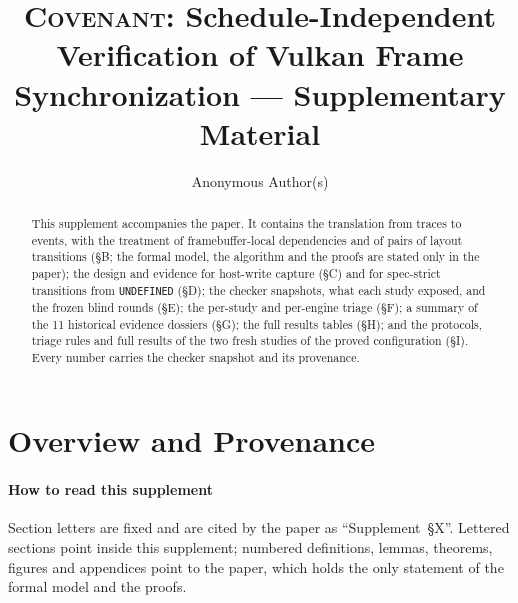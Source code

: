 \documentclass[acmtog,anonymous,review]{acmart}
\newcommand{\code}[1]{\texttt{#1}}
\begin{document}
\title{\textsc{Covenant}: Schedule-Independent Verification of Vulkan Frame Synchronization --- Supplementary Material}
\author{Anonymous Author(s)}

\begin{abstract}
This supplement accompanies the paper. It contains the translation from traces to events, with the treatment of
framebuffer-local dependencies and of pairs of layout transitions (\S B; the formal model, the algorithm and the
proofs are stated only in the paper); the design and evidence for host-write capture (\S C) and for spec-strict
transitions from \code{UNDEFINED} (\S D); the checker snapshots, what each study exposed, and the frozen blind rounds
(\S E); the per-study and per-engine triage (\S F); a summary of the 11 historical evidence dossiers (\S G); the full
results tables (\S H); and the protocols, triage rules and full results of the two fresh studies of the proved
configuration (\S I). Every number carries the checker snapshot and its provenance.
\end{abstract}

\maketitle
{}

\appendix

\section{Overview and Provenance}
\label{sup:overview}

\paragraph{How to read this supplement}
Section letters are fixed and are cited by the paper as ``Supplement~\S X''. Lettered sections point inside this
supplement; numbered definitions, lemmas, theorems, figures and appendices point to the paper, which holds the only
statement of the formal model and the proofs.
\end{document}
